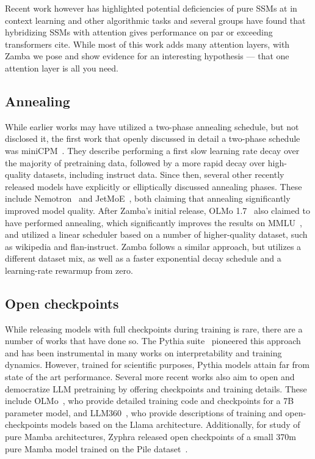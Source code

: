 Recent work however has highlighted potential deficiencies of pure SSMs at in context learning and other algorithmic tasks and several groups have found that hybridizing SSMs with attention gives performance on par or exceeding transformers cite. While most of this work adds many attention layers, with Zamba we pose and show evidence for an interesting hypothesis — that one attention layer is all you need.

\subsection{Annealing}
While earlier works may have utilized a two-phase annealing schedule, but not disclosed it, the first work that openly discussed in detail a two-phase schedule was miniCPM~\citep{hu2024minicpm}. They describe performing a first slow learning rate decay over the majority of pretraining data, followed by a more rapid decay over high-quality datasets, including instruct data. Since then, several other recently released models have explicitly or elliptically discussed annealing phases. These include Nemotron~\citep{parmar2024nemotron4} and JetMoE~\citep 
{shen2024jetmoe}, both claiming that annealing significantly improved model quality. After Zamba's initial release, OLMo 1.7~\citep{olmo-1.7} also claimed to have performed annealing, which significantly improves the results on MMLU~\citep{mmlu}, and utilized a linear scheduler based on a number of higher-quality dataset, such as wikipedia and flan-instruct. Zamba follows a similar approach, but utilizes a different dataset mix, as well as a faster exponential decay schedule and a learning-rate rewarmup from zero.

\subsection{Open checkpoints} While releasing models with full checkpoints during training is rare, there are a number of works that have done so. The Pythia suite~\citep{biderman2023pythia} pioneered this approach and has been instrumental in many works on interpretability and training dynamics. However, trained for scientific purposes, Pythia models attain far from state of the art performance. Several more recent works also aim to open and democratize LLM pretraining by offering checkpoints and training details. These include OLMo~\citep{groeneveld2024olmo}, who provide detailed training code and checkpoints for a 7B parameter model, and LLM360~\citep{liu2023llm360}, who provide descriptions of training and open-checkpoints models based on the Llama architecture. Additionally, for study of pure Mamba architectures, Zyphra released open checkpoints of a small 370m pure Mamba model trained on the Pile dataset~\citep{zyphra-mamba}.

